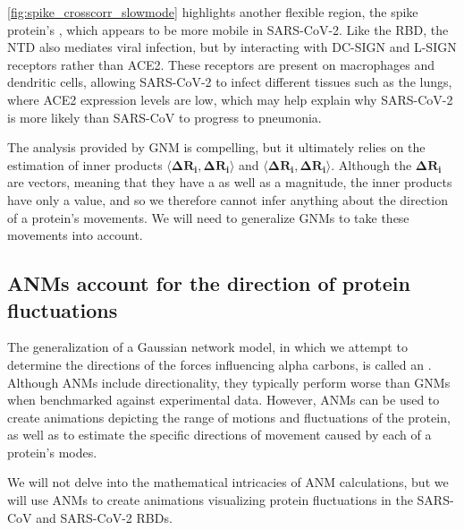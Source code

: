 \autoref{fig:spike_crosscorr_slowmode} highlights another flexible region, the spike protein's , which appears to be more mobile in SARS-CoV-2. Like the RBD, the NTD also mediates viral infection, but by interacting with DC-SIGN and L-SIGN receptors rather than ACE2. These receptors are present on macrophages and dendritic cells, allowing SARS-CoV-2 to infect different tissues such as the lungs, where ACE2 expression levels are low, which may help explain why SARS-CoV-2 is more likely than SARS-CoV to progress to pneumonia.

The analysis provided by GNM is compelling, but it ultimately relies on the estimation of inner products $ \langle \mathbf{\Delta R_i}, \mathbf{\Delta R_i} \rangle $ and $ \langle \mathbf{\Delta R_i}, \mathbf{\Delta R_i} \rangle $. Although the $ \mathbf{\Delta R_i} $ are vectors, meaning that they have a  as well as a magnitude, the inner products have only a value, and so we therefore cannot infer anything about the direction of a protein's movements. We will need to generalize GNMs to take these movements into account.

\FloatBarrier
{}
\subsection{ANMs account for the direction of protein fluctuations}

The generalization of a Gaussian network model, in which we attempt to determine the directions of the forces influencing alpha carbons, is called an . Although ANMs include directionality, they typically perform worse than GNMs when benchmarked against experimental data. However, ANMs can be used to create animations depicting the range of motions and fluctuations of the protein, as well as to estimate the specific directions of movement caused by each of a protein's modes.

We will not delve into the mathematical intricacies of ANM calculations, but we will use ANMs to create animations visualizing protein fluctuations in the SARS-CoV and SARS-CoV-2 RBDs.

